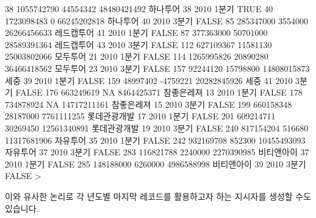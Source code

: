 \begin{Schunk}
\begin{Soutput}
38  1055742790   44554342 48480421492     하나투어   38 2010 1분기  TRUE
40  1723098483          0 66245202818     하나투어   40 2010 3분기 FALSE
85   285347000    3554000 26266456633   레드캡투어   41 2010 1분기 FALSE
87   377363000   50701000 28589391364   레드캡투어   43 2010 3분기 FALSE
112  627109367   11581130 25003802066     모두투어   21 2010 1분기 FALSE
114 1265995826   20890280 36466418562     모두투어   23 2010 3분기 FALSE
157   92244120   15798800 14808015873         세중   39 2010 1분기 FALSE
159   48997402   -4759221 20282845926         세중   41 2010 3분기 FALSE
176  663249619         NA  8464425371   참좋은레져   13 2010 1분기 FALSE
178  734878924         NA 14717211161   참좋은레져   15 2010 3분기 FALSE
199  660158348   28187000  7761111255 롯데관광개발   17 2010 1분기 FALSE
201  609214711   30269450 12561340891 롯데관광개발   19 2010 3분기 FALSE
240  817154204     516680 11317681906     자유투어   35 2010 1분기 FALSE
242  932169708     852300 10455493093     자유투어   37 2010 3분기 FALSE
283  116821788    2240000  2270390985   비티앤아이   37 2010 1분기 FALSE
285  148188000    6260000  4986588998   비티앤아이   39 2010 3분기 FALSE
> 
\end{Soutput}
\end{Schunk}

이와 유사한 논리로 각 년도별 마지막 레코드를 활용하고자 하는 지시자를 생성할 수도 있습니다. 


